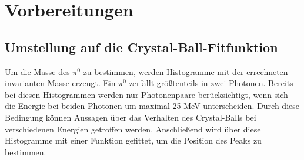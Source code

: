 \documentclass[a4paper,11pt,oneside,final,german,openbib,pdftex]{scrbook}
\begin{document}
{















\chapter{Vorbereitungen}
\label{chap:Vorbereitung}


\section{Umstellung auf die Crystal-Ball-Fitfunktion}
\label{sec:CB-Funktion}

Um die Masse des $\pi^0$ zu bestimmen, werden Histogramme mit der errechneten invarianten Masse erzeugt. Ein $\pi^0$ zerf\"allt gr\"o{\ss}tenteils in zwei Photonen. Bereits bei diesen Histogrammen werden nur Photonenpaare ber\"ucksichtigt, wenn sich die Energie bei beiden Photonen um maximal 25 MeV unterscheiden. Durch diese Bedingung k\"onnen Aussagen \"uber das Verhalten des Crystal-Balls bei verschiedenen Energien getroffen werden.
 Anschlie{\ss}end wird \"uber diese Histogramme mit einer Funktion gefittet, um die Position des Peaks zu bestimmen.

}
\end{document}

